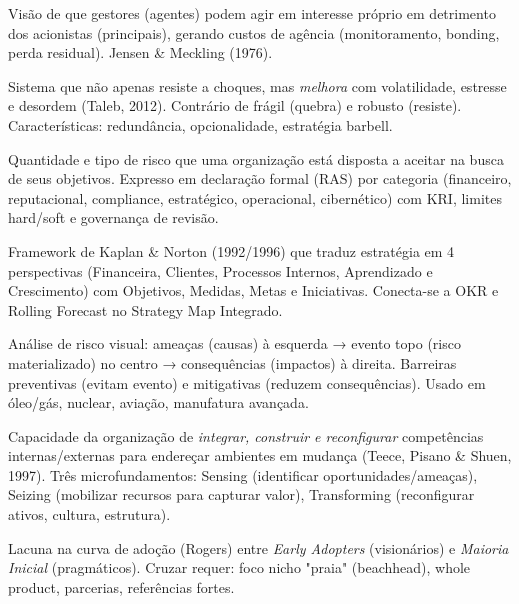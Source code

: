 \begin{ecglossario}

\item[\textbf{Agência (Teoria da)}] Visão de que gestores (agentes) podem agir em interesse próprio em detrimento dos acionistas (principais), gerando custos de agência (monitoramento, bonding, perda residual). Jensen \& Meckling (1976).

\item[\textbf{Antifrágil}] Sistema que não apenas resiste a choques, mas \textit{melhora} com volatilidade, estresse e desordem (Taleb, 2012). Contrário de frágil (quebra) e robusto (resiste). Características: redundância, opcionalidade, estratégia barbell.

\item[\textbf{Apetite a Risco (Risk Appetite)}] Quantidade e tipo de risco que uma organização está disposta a aceitar na busca de seus objetivos. Expresso em declaração formal (RAS) por categoria (financeiro, reputacional, compliance, estratégico, operacional, cibernético) com KRI, limites hard/soft e governança de revisão.

\item[\textbf{Balanced Scorecard (BSC)}] Framework de Kaplan \& Norton (1992/1996) que traduz estratégia em 4 perspectivas (Financeira, Clientes, Processos Internos, Aprendizado e Crescimento) com Objetivos, Medidas, Metas e Iniciativas. Conecta-se a OKR e Rolling Forecast no Strategy Map Integrado.

\item[\textbf{Bow-Tie Analysis}] Análise de risco visual: ameaças (causas) à esquerda → evento topo (risco materializado) no centro → consequências (impactos) à direita. Barreiras preventivas (evitam evento) e mitigativas (reduzem consequências). Usado em óleo/gás, nuclear, aviação, manufatura avançada.

\item[\textbf{Capacidades Dinâmicas}] Capacidade da organização de \textit{integrar, construir e reconfigurar} competências internas/externas para endereçar ambientes em mudança (Teece, Pisano \& Shuen, 1997). Três microfundamentos: Sensing (identificar oportunidades/ameaças), Seizing (mobilizar recursos para capturar valor), Transforming (reconfigurar ativos, cultura, estrutura).

\item[\textbf{Chasm (Abismo — Geoffrey Moore)}] Lacuna na curva de adoção (Rogers) entre \textit{Early Adopters} (visionários) e \textit{Maioria Inicial} (pragmáticos). Cruzar requer: foco nicho "praia" (beachhead), whole product, parcerias, referências fortes.


\end{ecglossario}
